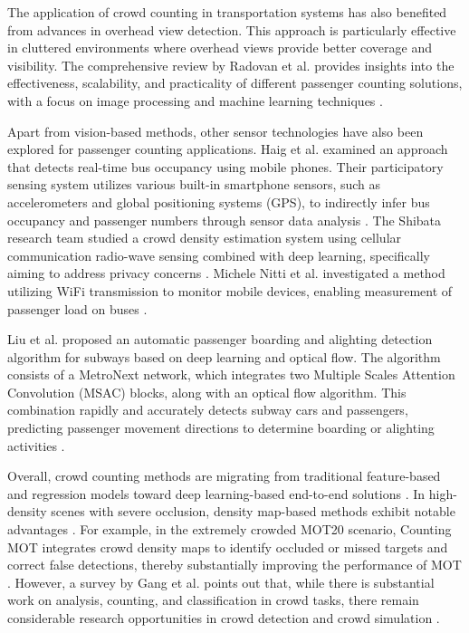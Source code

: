 The application of crowd counting in transportation systems has also benefited from advances in overhead view detection. This approach is particularly effective in cluttered environments where overhead views provide better coverage and visibility. The comprehensive review by Radovan et al. provides insights into the effectiveness, scalability, and practicality of different passenger counting solutions, with a focus on image processing and machine learning techniques \cite{02_noauthor_review_nodate}.

Apart from vision-based methods, other sensor technologies have also been explored for passenger counting applications. Haig et al. examined an approach that detects real-time bus occupancy using mobile phones. Their participatory sensing system utilizes various built-in smartphone sensors, such as accelerometers and global positioning systems (GPS), to indirectly infer bus occupancy and passenger numbers through sensor data analysis \cite{18_haig_real-time_2021}. The Shibata research team studied a crowd density estimation system using cellular communication radio-wave sensing combined with deep learning, specifically aiming to address privacy concerns \cite{52_shibata_people_2019}. Michele Nitti et al. investigated a method utilizing WiFi transmission to monitor mobile devices, enabling measurement of passenger load on buses \cite{70_noauthor_iabacus_nodate}.

Liu et al. proposed an automatic passenger boarding and alighting detection algorithm for subways based on deep learning and optical flow. The algorithm consists of a MetroNext network, which integrates two Multiple Scales Attention Convolution (MSAC) blocks, along with an optical flow algorithm. This combination rapidly and accurately detects subway cars and passengers, predicting passenger movement directions to determine boarding or alighting activities \cite{38_liu_automatic_2021}.


Overall, crowd counting methods are migrating from traditional feature-based and regression models toward deep learning-based end-to-end solutions \cite{13_dogra_survey_2024}. In high-density scenes with severe occlusion, density map-based methods exhibit notable advantages \cite{17_gupta_crowd_2024}. For example, in the extremely crowded MOT20 scenario, Counting MOT integrates crowd density maps to identify occluded or missed targets and correct false detections, thereby substantially improving the performance of MOT \cite{125}. However, a survey by Gang et al. points out that, while there is substantial work on analysis, counting, and classification in crowd tasks, there remain considerable research opportunities in crowd detection and crowd simulation \cite{01_noauthor_deep_2024}.

